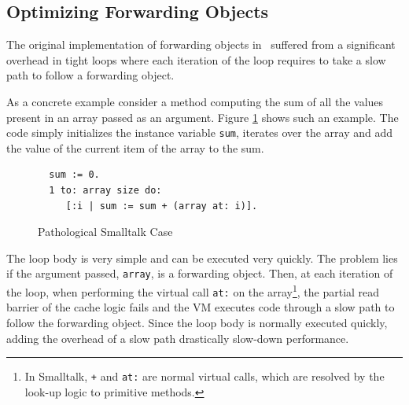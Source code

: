 \documentclass[sigplan,10pt,screen]{acmart}\settopmatter{printfolios=true,printccs=true,printacmref=true}
\begin{document}
\subsection{Optimizing Forwarding Objects}

The original implementation of forwarding objects in~\cite{Forwarders} suffered from a significant overhead in
tight loops where each iteration of the loop requires to take a slow path to follow a forwarding object.


As a concrete example consider a method computing the sum of all the values present in an array passed as an argument. Figure \ref{fig:code} shows such an example. The code simply initializes the instance variable \texttt{sum}, iterates over the array and add the value of the current item of the array to the sum.

\begin{figure}[bth]
\begin{verbatim}
  sum := 0.
  1 to: array size do: 
     [:i | sum := sum + (array at: i)].
\end{verbatim}
		\vspace{-0.3cm}
		\caption{Pathological Smalltalk Case\vspace{-0.3cm}}
		\label{fig:code}
 \end{figure}

The loop body is very simple and can be executed very quickly. The problem lies if the argument passed, \texttt{array}, is a forwarding object. Then, at each iteration of the loop, when performing the virtual call \texttt{at:} on the array\footnote{In Smalltalk, \texttt{+} and \texttt{at:} are normal virtual calls, which are resolved by the look-up logic to primitive methods.}, the partial read barrier of the cache logic fails and the VM executes code through a slow path to follow the forwarding object. Since the loop body is normally executed quickly, adding the overhead of a slow path drastically slow-down performance. 
\end{document}
